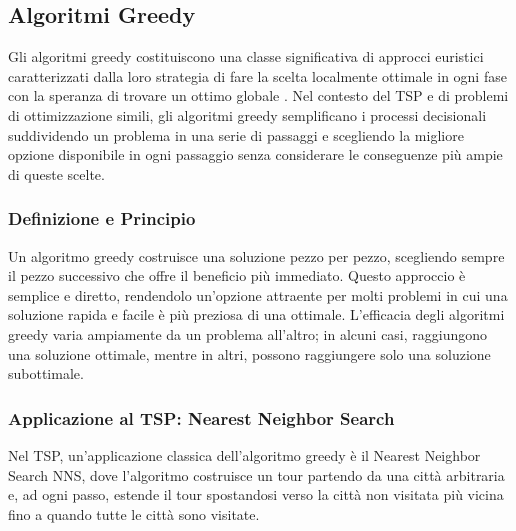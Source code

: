 \subsection{Algoritmi Greedy}

Gli algoritmi greedy costituiscono una classe significativa di approcci euristici caratterizzati dalla loro strategia di fare la scelta localmente ottimale in ogni fase con la speranza di trovare un ottimo globale \cite{Cormen2009}. Nel contesto del \gls{TSP} e di problemi di ottimizzazione simili, gli algoritmi greedy semplificano i processi decisionali suddividendo un problema in una serie di passaggi e scegliendo la migliore opzione disponibile in ogni passaggio senza considerare le conseguenze più ampie di queste scelte\cite{Johnson2002}.

\subsubsection{Definizione e Principio}

Un algoritmo greedy costruisce una soluzione pezzo per pezzo, scegliendo sempre il pezzo successivo che offre il beneficio più immediato\cite{Papadimitriou1998}. Questo approccio è semplice e diretto, rendendolo un'opzione attraente per molti problemi in cui una soluzione rapida e facile è più preziosa di una ottimale. L'efficacia degli algoritmi greedy varia ampiamente da un problema all'altro; in alcuni casi, raggiungono una soluzione ottimale, mentre in altri, possono raggiungere solo una soluzione subottimale\cite{Lawler1985}.

\subsubsection{Applicazione al \gls{TSP}: Nearest Neighbor Search}

Nel \gls{TSP}, un'applicazione classica dell'algoritmo greedy è il Nearest Neighbor Search \gls{NNS}, dove l'algoritmo costruisce un tour partendo da una città arbitraria e, ad ogni passo, estende il tour spostandosi verso la città non visitata più vicina fino a quando tutte le città sono visitate\cite{Gutin2016}.


